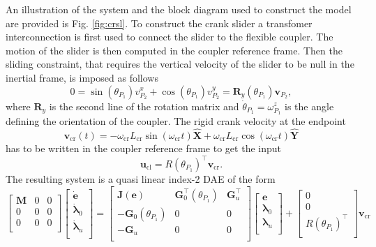 \documentclass{svjour3}                     %
\begin{document}
An illustration of the system and the block diagram used to construct the model are provided is Fig. \ref{fig:crsl}. To construct the crank slider a transfomer interconnection is first used to connect the slider to the flexible coupler. The motion of the slider is then computed in the coupler reference frame. Then the sliding constraint, that requires the vertical velocity of the slider to be null in the inertial frame, is imposed as follows
\[
0 = \sin(\theta_{P_1}) v^x_{P_2} + \cos(\theta_{P_1}) v^y_{P_2} = \bm{R}_y(\theta_{P_1}) \bm{v}_{P_2},
\]
where $\bm{R}_y$ is the second line of the rotation matrix and $\dot{\theta}_{P_1} = \omega_{P_1}^z$ is the angle defining the orientation of the coupler. The rigid crank velocity at the endpoint  
\begin{equation*}
\bm{v}_{\text{cr}}(t) = -\omega_{\text{cr}} L _{\text{cr}} \sin(\omega_{\text{cr}} t) \widehat{\bm{X}} + \omega_{\text{cr}} L _{\text{cr}} \cos(\omega_{\text{cr}} t) \widehat{\bm{Y}}
\end{equation*} 
has to be written in the coupler reference frame to get the input
\begin{equation}
\bm{u}_{\text{cl}} = R(\theta_{P_1})^\top \bm{v}_{\text{cr}}.
\end{equation}
The resulting system is a quasi linear index-2 DAE of the form
\begin{equation*}
\begin{bmatrix}
\bm{M} & 0 & 0 \\
0 & 0 & 0 \\
0 & 0 & 0 \\
\end{bmatrix}
\begin{bmatrix}
\dot{\bm{e}} \\ \dot{\bm{\lambda}}_0 \\ \dot{\bm{\lambda}}_u \\
\end{bmatrix}= 
\begin{bmatrix}
\bm{J}(\bm{e}) & \bm{G}_0^\top(\theta_{P_1}) & \bm{G}_u^\top \\
-\bm{G}_0(\theta_{P_1}) & 0 & 0 \\
-\bm{G}_u & 0 & 0 \\
\end{bmatrix}
\begin{bmatrix}
\bm{e} \\ \bm{\lambda}_0 \\ \bm{\lambda}_u \\
\end{bmatrix} + 
\begin{bmatrix}
0 \\ 0 \\ R(\theta_{P_1})^\top \\
\end{bmatrix}
\bm{v}_{\text{cr}}
\end{equation*}
\end{document}
